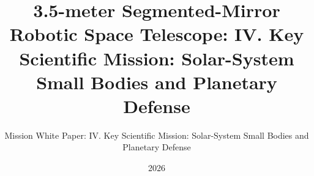 \newcommand{\wpvolumelabel}{IV}
\newcommand{\wpvolumetitle}{Key Scientific Mission: Solar-System Small Bodies and Planetary Defense}
\title{3.5-meter Segmented-Mirror Robotic Space Telescope: \wpvolumelabel. \wpvolumetitle}
\subtitle{Mission White Paper: \wpvolumelabel. \wpvolumetitle}
\newcommand{\wpauthors}{Juhan Kim$^{1}$, Yong-Woo Kang$^{2}$, Sang Hyun Lee$^{2,3}$, Jeong-Yeol Han$^{2,4}$, Sungwook E. Hong$^{2,4}$, Bongkon Moon$^{2,4}$, Donguk Song$^{2}$, Juhyung Kang$^{2}$, Myeong-Gu Park$^{5}$, Sang Chul Kim$^{2,4}$, Chung-Uk Lee$^{2}$, Sangmo Tony Sohn$^{6}$, Arman Shafieloo$^{2,4}$, David Parkinson$^{2,4}$, Hong Soo Park$^{2,4}$, Dohyeong Kim$^{7}$, Chan Park$^{2}$, Jungjoo Sohn$^{8}$, Young-Beom Jeon$^{2}$, Jong-Hak Woo$^{9}$, Hyung Mok Lee$^{9}$, Hong Bae Ann$^{7}$, Myungkook James Jee$^{10}$, Mansoo Choi$^{2}$, Changbom Park$^{1}$}
\date{2026}
\newcommand{\wpabstract}{%
The baseline 0.2--1.5\,$\mu$m observatory provides rapid-response astrometry, visible and near-infrared taxonomy, rotation and phase curves, recovery, and long-arc orbit improvement for near-Earth objects and other small bodies. The instrument study also evaluates calibrated throughput to 2.70\,$\mu$m with a 3.0\,$\mu$m operational band-edge goal. A reduction to 2.5\,$\mu$m remains the formal engineering off-ramp if thermal, detector, cooling, mass, power, or cost constraints require it. The \facility\ does not carry a mid-infrared channel. Coordinated ground-based mid-infrared telescopes provide the thermal fluxes required to infer diameter and albedo, while the space mission supplies contemporaneous reflected-light measurements and observing geometry. The program combines recovery, physical characterization, orbit refinement, and covariance-based hazard assessment. Its CODES dynamics system and OGFinder-to-OpenOrb processing path connect measured astrometry to reproducible orbit solutions and close-approach predictions.
}
\newcommand{\wpkeywords}{\textbf{Keywords:} near-Earth objects, planetary defense, small bodies, astrometry, orbit determination, optical and near-infrared spectroscopy}
\newcommand{\wpchapteroffset}{3}
\newcommand{\MakeVolumeBody}{%
  \definecolor{Blue1}{HTML}{C89562}%
  \definecolor{Blue2}{HTML}{A4612E}%
  \definecolor{Blue3}{HTML}{713F24}%
  }
